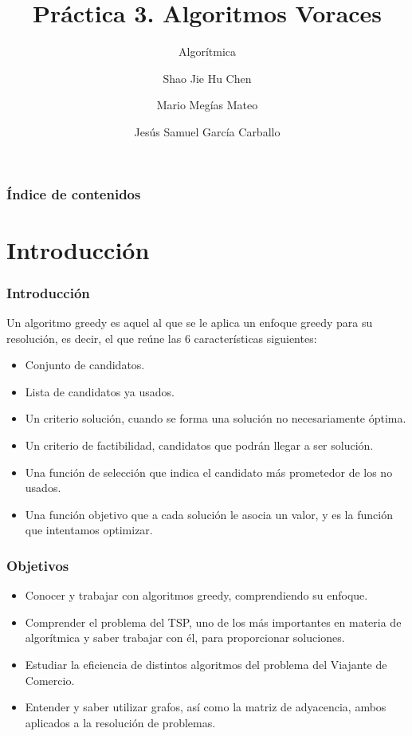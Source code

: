 \documentclass[13pt]{beamer}
\author{Shao Jie Hu Chen \and Mario Megías Mateo \and Jesús Samuel García Carballo}
\title{Práctica 3. Algoritmos Voraces}
\subtitle{Algorítmica}
\institute{Equipo Rojo}
\begin{document}
	
	\begin{frame}[plain]
		\maketitle
	\end{frame}
	
	\begin{frame}
		\frametitle{Índice de contenidos}
		\tableofcontents
	\end{frame}


    \section{Introducción}

	\begin{frame}
		\frametitle{Introducción}
		Un algoritmo greedy es aquel al que se le aplica un enfoque greedy para su resolución, es decir, el que reúne las 6 características siguientes:
		\begin{itemize}
			\item Conjunto de candidatos.
			\item Lista de candidatos ya usados.
			\item Un criterio solución, cuando se forma una solución no necesariamente óptima.
			\item Un criterio de factibilidad, candidatos que podrán llegar a ser solución.
			\item Una función de selección que indica el candidato más prometedor de los no usados.
			\item Una función objetivo que a cada solución le asocia un valor, y es la función que intentamos optimizar.
		\end{itemize}
	\end{frame}

	\begin{frame}
		\frametitle{Objetivos}
			\begin{itemize}
				\item Conocer y trabajar con algoritmos greedy, comprendiendo su enfoque.
				\item Comprender el problema del TSP, uno de los más importantes en materia de algorítmica y saber trabajar con él, para proporcionar soluciones.
				\item Estudiar la eficiencia de distintos algoritmos del problema del Viajante de Comercio.
				\item Entender y saber utilizar grafos, así como la matriz de adyacencia, ambos aplicados a la resolución de problemas.
			\end{itemize}		
	\end{frame}
\end{document}
